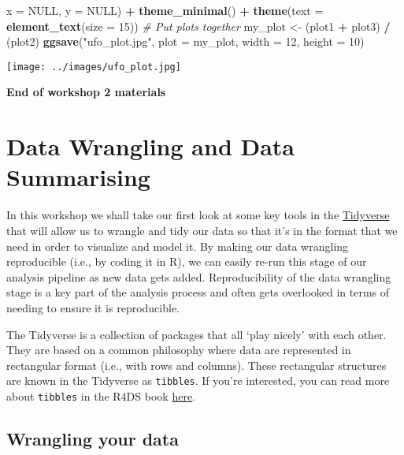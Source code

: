 \documentclass[
]{book}
\newenvironment{Shaded}{\begin{snugshade}}{\end{snugshade}}
\newcommand{\AttributeTok}[1]{\textcolor[rgb]{0.13,0.29,0.53}{#1}}
\newcommand{\CommentTok}[1]{\textcolor[rgb]{0.56,0.35,0.01}{\textit{#1}}}
\newcommand{\ConstantTok}[1]{\textcolor[rgb]{0.56,0.35,0.01}{#1}}
\newcommand{\DecValTok}[1]{\textcolor[rgb]{0.00,0.00,0.81}{#1}}
\newcommand{\FunctionTok}[1]{\textcolor[rgb]{0.13,0.29,0.53}{\textbf{#1}}}
\newcommand{\NormalTok}[1]{#1}
\newcommand{\OtherTok}[1]{\textcolor[rgb]{0.56,0.35,0.01}{#1}}
\newcommand{\SpecialCharTok}[1]{\textcolor[rgb]{0.81,0.36,0.00}{\textbf{#1}}}
\newcommand{\StringTok}[1]{\textcolor[rgb]{0.31,0.60,0.02}{#1}}
\begin{document}
\begin{Shaded}
\begin{Highlighting}[]
       \AttributeTok{x =} \ConstantTok{NULL}\NormalTok{, }
       \AttributeTok{y =} \ConstantTok{NULL}\NormalTok{) }\SpecialCharTok{+}
  \FunctionTok{theme\_minimal}\NormalTok{() }\SpecialCharTok{+}
  \FunctionTok{theme}\NormalTok{(}\AttributeTok{text =} \FunctionTok{element\_text}\NormalTok{(}\AttributeTok{size =} \DecValTok{15}\NormalTok{))}
\CommentTok{\# Put plots together}
\NormalTok{my\_plot }\OtherTok{\textless{}{-}}\NormalTok{ (plot1 }\SpecialCharTok{+}\NormalTok{ plot3) }\SpecialCharTok{/}\NormalTok{ (plot2)}
\FunctionTok{ggsave}\NormalTok{(}\StringTok{"ufo\_plot.jpg"}\NormalTok{, }\AttributeTok{plot =}\NormalTok{ my\_plot, }\AttributeTok{width =} \DecValTok{12}\NormalTok{, }\AttributeTok{height =} \DecValTok{10}\NormalTok{)}
\end{Highlighting}
\end{Shaded}

{\texttt{[image: ../images/ufo\_plot.jpg]}}

\textbf{End of workshop 2 materials}

\hypertarget{data-wrangling-and-data-summarising}{%
\chapter{Data Wrangling and Data Summarising}\label{data-wrangling-and-data-summarising}}

In this workshop we shall take our first look at some key tools in the \href{https://www.tidyverse.org}{Tidyverse} that will allow us to wrangle and tidy our data so that it's in the format that we need in order to visualize and model it. By making our data wrangling reproducible (i.e., by coding it in R), we can easily re-run this stage of our analysis pipeline as new data gets added. Reproducibility of the data wrangling stage is a key part of the analysis process and often gets overlooked in terms of needing to ensure it is reproducible.

The Tidyverse is a collection of packages that all `play nicely' with each other. They are based on a common philosophy where data are represented in rectangular format (i.e., with rows and columns). These rectangular structures are known in the Tidyverse as \texttt{tibbles}. If you're interested, you can read more about \texttt{tibbles} in the R4DS book \href{https://r4ds.had.co.nz/tibbles.html}{here}.

\hypertarget{wrangling-your-data}{%
\section{Wrangling your data}\label{wrangling-your-data}}
\end{document}
